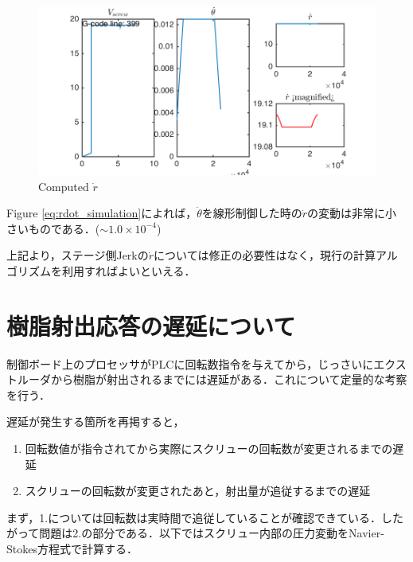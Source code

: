 \documentclass[twocolumn,oneside,a4paper]{article}
\begin{document}
\begin{figure}[htbp]\label{eq:rdot_simulation}
    \includegraphics[bb=0 0 432 216,width=1\columnwidth]{compute_rdot_screenshot.png}
    \caption{Computed $\dot r$}
    \label{fig:compute_rdot}
\end{figure}

Figure \ref{eq:rdot_simulation}によれば，$\dot{\theta}$を線形制御した時の$\dot r$の変動は非常に小さいものである．($\sim 1.0 \times 10^{-4}$)

上記より，ステージ側Jerkの$\dot r$については修正の必要性はなく，現行の計算アルゴリズムを利用すればよいといえる．

\section{樹脂射出応答の遅延について}
制御ボード上のプロセッサがPLCに回転数指令を与えてから，じっさいにエクストルーダから樹脂が射出されるまでには遅延がある．これについて定量的な考察を行う．

遅延が発生する箇所を再掲すると，
\begin{enumerate}
    \item 回転数値が指令されてから実際にスクリューの回転数が変更されるまでの遅延
    \item スクリューの回転数が変更されたあと，射出量が追従するまでの遅延
\end{enumerate}

まず，1.については回転数は実時間で追従していることが確認できている．したがって問題は2.の部分である．以下ではスクリュー内部の圧力変動をNavier-Stokes方程式で計算する．


\end{document}
